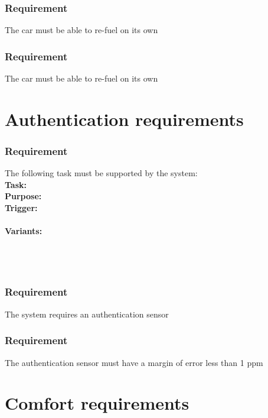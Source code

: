 \documentclass{article}
\begin{document}
{      \subsubsection{Requirement}
\hfill \break 
\- \- \-The car must be able to re-fuel on its own
      \subsubsection{Requirement}
\hfill \break 
\- \- \-The car must be able to re-fuel on its own

\section{Authentication requirements}
\setcounter{subsubsection}{0}
\subsubsection {Requirement}
\hfill \break 
\- \- \-The following task must be supported by the system:\\
\hfill \break 
\textbf{Task:} \\
\textbf{Purpose:} \\
\textbf{Trigger:} \\
\\
\noindent
\textbf{Variants:}     \\
\tab{ }  \\
\tab{ }  \\
\tab{ }  \\
\tab{ }   

    \subsubsection{Requirement}
\hfill \break 
\- \- \-The system requires an authentication sensor
    \subsubsection{Requirement}
\hfill \break 
\- \- \-The authentication sensor must have a margin of error less than 1 ppm
\bigskip

\section{Comfort requirements}
\setcounter{subsubsection}{0}
}
\end{document}
